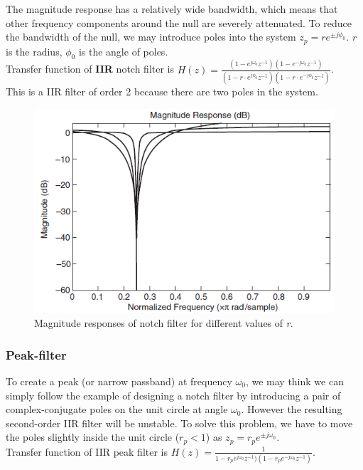The magnitude response has a relatively wide bandwidth, which means that other frequency components around the null are severely attenuated. 
To reduce the bandwidth of the null, we may introduce poles into the system $z_p = r e^{\pm j\phi_0}$. $r$ is the radius, $\phi_0$ is the angle of poles.\\

\noindent Transfer function of \textbf{IIR} notch filter is  $H(z) = \frac{(1-e^{j\omega_0} z^{-1})(1-e^{-j\omega_0} z^{-1})}{(1-r\cdot e^{j\phi_0} z^{-1})(1-r\cdot e^{-j\phi_0} z^{-1})} $. \\

\noindent This is a IIR filter of order 2 because there are two poles in the system.

\begin{figure} [H]
	\centering
	\includegraphics[width=0.85\linewidth]{graphics/11.png}
	\caption{Magnitude responses of notch filter for different values of \textit{r}.}
	\label{fig:11}
\end{figure}

\subsubsection{Peak-filter}
To create a peak (or narrow passband) at frequency $\omega_0$, we may think we can simply follow the example of designing a notch filter by introducing a pair of complex-conjugate poles on the unit circle at angle $\omega_0$.
However the resulting second-order IIR filter will be unstable. To solve this
problem, we have to move the poles slightly inside the unit circle ($r_p < 1$) as $z_p = r_p e^{\pm j \omega_0}$.\\

\noindent Transfer function of IIR peak filter is  $H(z) = \frac{1}{1-r_p e^{j\omega_0} z^{-1})(1- r_p e^{-j\omega_0} z^{-1})}$.\\

